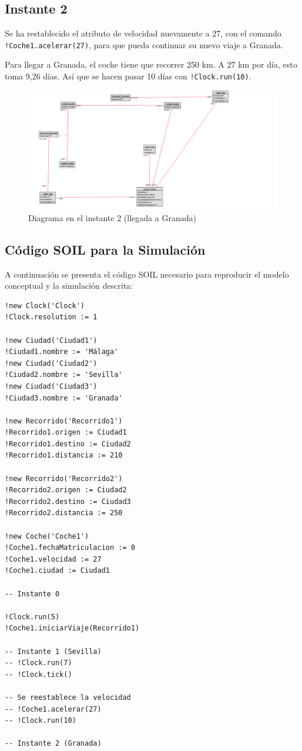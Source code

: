 \documentclass[12pt.a4paper]{article}
\begin{document}
\subsection{Instante 2}
Se ha restablecido el atributo de velocidad nuevamente a 27, con el comando \texttt{!Coche1.acelerar(27)}, para que pueda continuar su nuevo viaje a Granada.

Para llegar a Granada, el coche tiene que recorrer 250 km. A 27 km por día, esto toma 9,26 días. Así que se hacen pasar 10 días con \texttt{!Clock.run(10)}.
\vspace{-0.5cm}
\begin{figure}[H]
    \centering
    \includegraphics[width=\linewidth]{fotosInstantes/Instante2.png}
    \caption{Diagrama en el instante 2 (llegada a Granada)}
\end{figure}

\subsection{Código SOIL para la Simulación}
A continuación se presenta el código SOIL necesario para reproducir el modelo conceptual y la simulación descrita:

\begin{verbatim}
!new Clock('Clock')
!Clock.resolution := 1

!new Ciudad('Ciudad1')
!Ciudad1.nombre := 'Málaga'
!new Ciudad('Ciudad2')
!Ciudad2.nombre := 'Sevilla'
!new Ciudad('Ciudad3')
!Ciudad3.nombre := 'Granada'

!new Recorrido('Recorrido1')
!Recorrido1.origen := Ciudad1
!Recorrido1.destino := Ciudad2
!Recorrido1.distancia := 210

!new Recorrido('Recorrido2')
!Recorrido2.origen := Ciudad2
!Recorrido2.destino := Ciudad3
!Recorrido2.distancia := 250

!new Coche('Coche1')
!Coche1.fechaMatriculacion := 0
!Coche1.velocidad := 27
!Coche1.ciudad := Ciudad1

-- Instante 0

!Clock.run(5)
!Coche1.iniciarViaje(Recorrido1)

-- Instante 1 (Sevilla)
-- !Clock.run(7)
-- !Clock.tick()

-- Se reestablece la velocidad
-- !Coche1.acelerar(27)
-- !Clock.run(10)

-- Instante 2 (Granada)

\end{verbatim}
\end{document}
